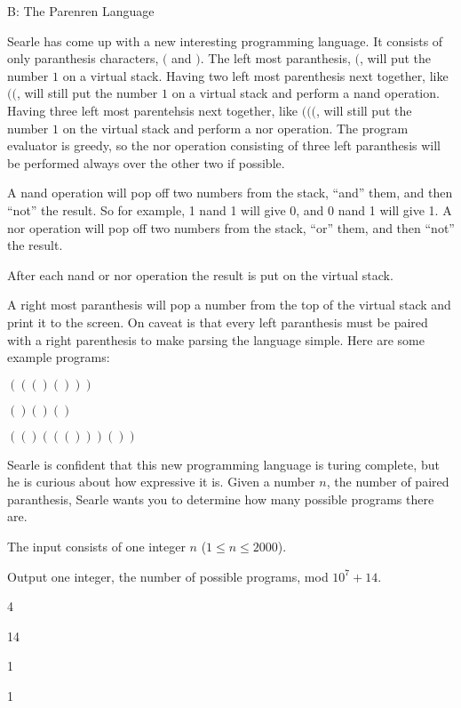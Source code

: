 \begin{problem}{B: The Parenren Language}

Searle has come up with a new interesting programming language.
It consists of only paranthesis characters, $($ and $)$.
The left most paranthesis, $($, will put the number $1$ on a virtual stack.
Having two left most parenthesis next together, like $(($, will still put the number $1$ on a virtual stack and perform a nand operation.
Having three left most parentehsis next together, like $((($, will still put the number $1$ on the virtual stack and perform a nor operation.
The program evaluator is greedy, so the nor operation consisting of three left paranthesis will be performed always over the other two if possible.

A nand operation will pop off two numbers from the stack, ``and'' them, and then ``not'' the result.
So for example, 1 nand 1 will give 0, and 0 nand 1 will give 1.
A nor operation will pop off two numbers from the stack, ``or'' them, and then ``not'' the result.

After each nand or nor operation the result is put on the virtual stack.

A right most paranthesis will pop a number from the top of the virtual stack and print it to the screen.
On caveat is that every left paranthesis must be paired with a right parenthesis to make parsing the language simple.
Here are some example programs:

$((()()))$

$()()()$

$(()((()))())$

Searle is confident that this new programming language is turing complete, but he is curious about how expressive it is.
Given a number $n$, the number of paired paranthesis, Searle wants you to determine how many possible programs there are.
\end{problem}

\begin{formalin}
The input consists of one integer $n$ ($1 \leq n \leq 2000$).
\end{formalin}

\begin{formalout}
Output one integer, the number of possible programs, mod $10^7 + 14$.
\end{formalout}

\begin{datain}
4
\end{datain}
\begin{dataout}
14
\end{dataout}

\begin{datain}
1
\end{datain}
\begin{dataout}
1
\end{dataout}

